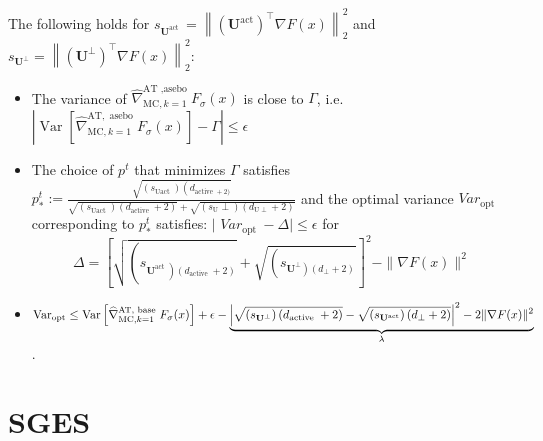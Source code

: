 \begin{thm}
	
	The following holds for $ s_{\mathbf{U}^{\text {act }}}=\left\|\left(\mathbf{U}^{\mathrm{act}}\right)^{\top} \nabla
	F(x)\right\|_{2}^{2} $ and $ s_{\mathbf{U}^{\perp}}=\left\|\left(\mathbf{U}^{\perp}\right)^{\top} \nabla
	F(x)\right\|_{2}^{2} :$ 
	
	\begin{itemize}

		\item The variance of $ \widehat{\nabla}_{\mathrm{MC}, k=1}^{\mathrm{AT} \text { ,asebo }} F_{\sigma}(x) $ is close to $ \Gamma $, i.e. $ \left|\operatorname{Var}\left[\widehat{\nabla}_{\mathrm{MC}, k=1}^{\mathrm{AT}, \text { asebo }} F_{\sigma}(x)\right]-\Gamma\right| \leq \epsilon $
		
		\item The choice of $ p^{t} $ that minimizes $ \Gamma $ satisfies $ p_{*}^{t}:=\frac{\sqrt{\left(s_{\text {Uact }}\right)\left(d_{\text {active }+2)}\right.}}{\sqrt{\left(s_{\text {Uact }}\right)\left(d_{\text {active }}+2\right)}+\sqrt{\left(s_{\mathrm{U}} \perp\right)\left(d_{\mathrm{U} \perp}+2\right)}} $ and the optimal variance  $Var _{\text {opt }} $ corresponding to $ p_{*}^{t} $ satisfies: $ \mid $  $Var _{\text {opt }}-\Delta \mid \leq \epsilon $ for 
		\begin{equation*}
			\Delta= \left[\sqrt{\left(s_{ \left.\mathbf{U}^{\text {act }}\right)\left(d_{\text {active }}+2\right)}\right.}+\sqrt{\left(s_{ \left.\mathbf{U}^{\perp}\right)\left(d_{\perp}+2\right)}\right.}\right]^{2}-\|\nabla F(x)\|^{2}
		\end{equation*}
	
		\item $ \mathrm{Var}_{\mathrm{opt}} \leq \operatorname{Var}\left[\widehat{\nabla}_{\mathrm{MC}, k=1}^{\mathrm{AT}, \text { base }} F_{\sigma}(x)\right]+\epsilon\\ -\underbrace{\left|\sqrt{\left(s_{\mathbf{U}^{\perp}}\right)\left(d_{\text {active }}+2\right)}-\sqrt{\left(s_{\mathbf{U}^{\mathrm{act}}}\right)\left(d_{\perp}+2\right)}\right|^{2}-2\|\nabla F(x)\|^{2}}_{\lambda} $.

	\end{itemize}

\end{thm}


\section{SGES}\label{sect:SGES}

